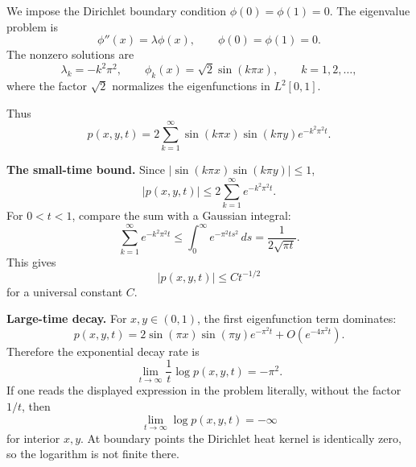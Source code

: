 \begin{solution}
We impose the Dirichlet boundary condition $\phi(0)=\phi(1)=0$. The eigenvalue problem is
\[
\phi''(x)=\lambda\phi(x),\qquad \phi(0)=\phi(1)=0.
\]
The nonzero solutions are
\[
\lambda_k=-k^2\pi^2,\qquad
\phi_k(x)=\sqrt2\sin(k\pi x),\qquad k=1,2,\dots,
\]
where the factor $\sqrt2$ normalizes the eigenfunctions in $L^2[0,1]$.

Thus
\[
p(x,y,t)=2\sum_{k=1}^\infty
\sin(k\pi x)\sin(k\pi y)e^{-k^2\pi^2t}.
\]

\textbf{The small-time bound.}
Since $|\sin(k\pi x)\sin(k\pi y)|\leq1$,
\[
|p(x,y,t)|\leq 2\sum_{k=1}^\infty e^{-k^2\pi^2t}.
\]
For $0<t<1$, compare the sum with a Gaussian integral:
\[
\sum_{k=1}^\infty e^{-k^2\pi^2t}
\leq \int_0^\infty e^{-\pi^2t s^2}\,ds
=\frac{1}{2\sqrt{\pi t}}.
\]
This gives
\[
|p(x,y,t)|\leq C t^{-1/2}
\]
for a universal constant $C$.

\textbf{Large-time decay.}
For $x,y\in(0,1)$, the first eigenfunction term dominates:
\[
p(x,y,t)
=2\sin(\pi x)\sin(\pi y)e^{-\pi^2t}
+O(e^{-4\pi^2t}).
\]
Therefore the exponential decay rate is
\[
\lim_{t\to\infty}\frac{1}{t}\log p(x,y,t)=-\pi^2.
\]
If one reads the displayed expression in the problem literally, without the factor $1/t$, then
\[
\lim_{t\to\infty}\log p(x,y,t)=-\infty
\]
for interior $x,y$. At boundary points the Dirichlet heat kernel is identically zero, so the logarithm is not finite there.
\end{solution}
